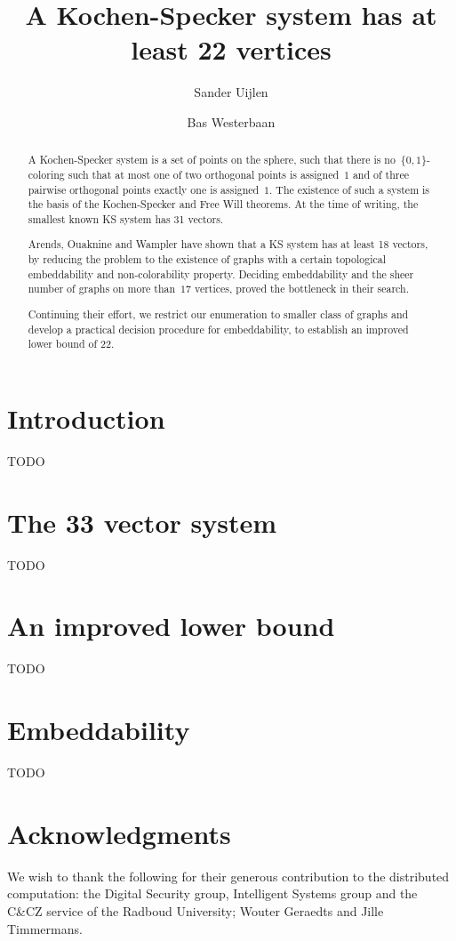 \documentclass[a4paper]{article}
\title{A Kochen-Specker system has at least 22 vertices}
\author{Sander Uijlen}
\author{Bas Westerbaan}
\affil{Institute for Computing and Information Sciences\\
       Radboud Universiteit Nijmegen\\
   \{\texttt{suijlen},\texttt{bwesterb}\}\texttt{@cs.ru.nl}}
\newcounter{main}
\theoremstyle{definition}
\theoremstyle{remark}
\begin{document}
\maketitle

\begin{abstract}
    A Kochen-Specker system is a set of points on the sphere,
    such that there is no~$\{0,1\}$-coloring such that
    at most one of two orthogonal points is assigned~$1$
    and of three pairwise orthogonal points exactly one
    is assigned~$1$.
    The existence of such a system is the basis of the Kochen-Specker
    and Free Will theorems.  At the time of writing, the smallest known
    KS system has 31 vectors.  

    Arends, Ouaknine and Wampler have shown that a KS system has at least
    18 vectors, by reducing the problem to the existence of graphs
    with a certain topological embeddability and non-colorability property.
    Deciding embeddability and the sheer number of graphs on more than~$17$
    vertices, proved the bottleneck in their search.

    Continuing their effort, we restrict our enumeration to smaller class of
    graphs and develop a practical decision procedure for embeddability, to
    establish an improved lower bound of 22.
\end{abstract}
    
\section{Introduction}

TODO

\section{The 33 vector system}
TODO

\section{An improved lower bound}
TODO

\section{Embeddability}
TODO

\section{Acknowledgments}
We wish to thank the following for their generous contribution to the
distributed computation:
    the Digital Security group, Intelligent Systems group
    and the C\&CZ service of the Radboud University;
    Wouter Geraedts and
    Jille Timmermans.

{}

\end{document}
